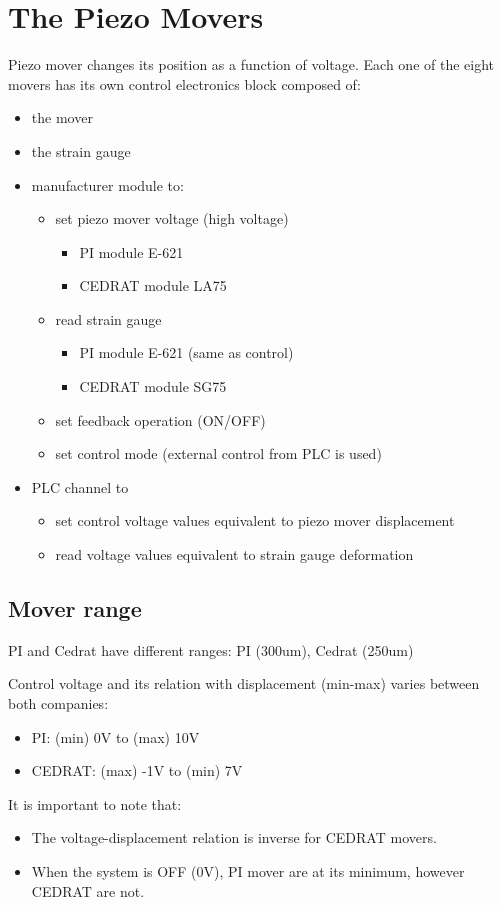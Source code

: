 \documentclass[a4paper,11pt]{book}
\begin{document}
\section{The Piezo Movers}
Piezo mover changes its position as a function of voltage. Each one of the eight movers has its own control electronics block composed of: 
\begin{itemize}
 \item the mover
\item the strain gauge
\item manufacturer module to:
\begin{itemize}
 \item set piezo mover voltage (high voltage)
 \begin{itemize}
\item PI module E-621
\item CEDRAT module LA75
\end{itemize}
\item read strain gauge
\begin{itemize}
\item PI module E-621 (same as control)
\item CEDRAT module SG75
\end{itemize}
\item set feedback operation (ON/OFF)
\item set control mode (external control from PLC is used)
\end{itemize}
\item PLC channel to
\begin{itemize}
\item set control voltage values equivalent to piezo mover displacement
\item read voltage values equivalent to strain gauge deformation
\end{itemize}
\end{itemize}

\subsection{Mover range}
PI and Cedrat have different ranges: PI (300um), Cedrat (250um)\par

Control voltage and its relation with displacement (min-max) varies between both companies:\par
\begin{itemize}
\item PI: 		(min)   0V   	to 	(max) 10V
\item CEDRAT: 	(max) -1V 	to	(min)    7V
\end{itemize}
It is important to note that:
\begin{itemize}
\item The voltage-displacement relation is inverse for CEDRAT movers.
\item When the system is OFF (0V), PI mover are at its minimum, however CEDRAT are not.
\end{itemize}
\end{document}
